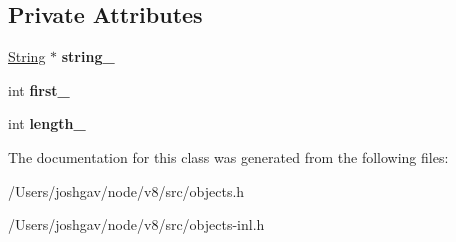 \subsection*{Private Attributes}
\begin{DoxyCompactItemize}
\item 
\hyperlink{classv8_1_1internal_1_1_string}{String} $\ast$ {\bfseries string\+\_\+}\hypertarget{classv8_1_1internal_1_1_string_1_1_sub_string_range_a9e7b47f25d1b7b860548bb66ef6dd68f}{}\label{classv8_1_1internal_1_1_string_1_1_sub_string_range_a9e7b47f25d1b7b860548bb66ef6dd68f}

\item 
int {\bfseries first\+\_\+}\hypertarget{classv8_1_1internal_1_1_string_1_1_sub_string_range_a6cc0c9fb6cf9f7bb1848a69a078341c1}{}\label{classv8_1_1internal_1_1_string_1_1_sub_string_range_a6cc0c9fb6cf9f7bb1848a69a078341c1}

\item 
int {\bfseries length\+\_\+}\hypertarget{classv8_1_1internal_1_1_string_1_1_sub_string_range_a9d3ffc49b14c030c8c6218afd68d1d98}{}\label{classv8_1_1internal_1_1_string_1_1_sub_string_range_a9d3ffc49b14c030c8c6218afd68d1d98}

\end{DoxyCompactItemize}


The documentation for this class was generated from the following files\+:\begin{DoxyCompactItemize}
\item 
/\+Users/joshgav/node/v8/src/objects.\+h\item 
/\+Users/joshgav/node/v8/src/objects-\/inl.\+h\end{DoxyCompactItemize}
